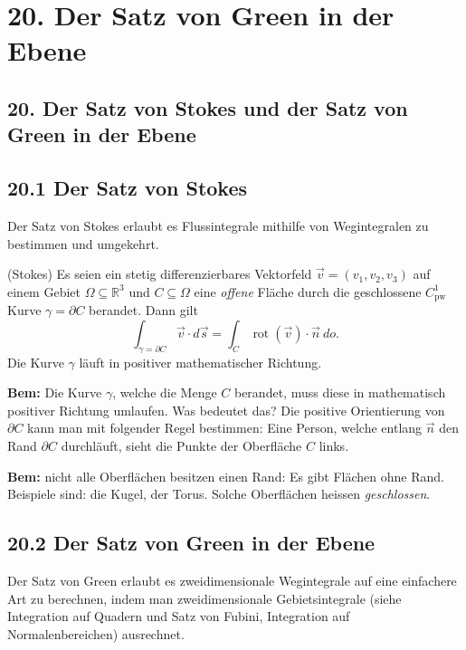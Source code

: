 \documentclass[a4paper,landscape,8pt]{extarticle}
\newcommand{\R}{\mathbb{R}}
\newcommand{\Bem}{\textbf{Bem: }}
\DeclareMathOperator{\rot}{rot}
\begin{document}
\begin{multicols*}{4}
\begin{warmup}
\end{warmup}

\section{20. Der Satz von Green in der Ebene}

\begin{warmup}
\section{20. Der Satz von Stokes und der Satz von Green in der Ebene}

\subsection{20.1 Der Satz von Stokes}

Der Satz von Stokes erlaubt es Flussintegrale mithilfe von Wegintegralen zu
bestimmen und umgekehrt.

\Satz (Stokes) Es seien ein stetig differenzierbares Vektorfeld $\vec{v}
=(v_1,v_2,v_3)$ auf einem Gebiet $\Omega\subseteq \R^3$ und $C\subseteq\Omega$
eine \emph{offene} Fläche durch die geschlossene $C^1_{\text{pw}}$ Kurve
$\gamma=\partial C$ berandet. Dann gilt
\[
\int_{\gamma=\partial C} \vec{v}\cdot d\vec{s} =
\int_C \rot(\vec{v})\cdot\vec{n} \ do.
\]
Die Kurve $\gamma$ läuft in positiver mathematischer Richtung.

\Bem Die Kurve $\gamma$, welche die Menge $C$ berandet, muss diese in
mathematisch positiver Richtung umlaufen. Was bedeutet das? Die positive
Orientierung von $\partial C$ kann man mit folgender Regel bestimmen: Eine
Person, welche entlang $\vec{n}$ den Rand $\partial C$ durchläuft, sieht die
Punkte der Oberfläche $C$ links.

\Bem nicht alle Oberflächen besitzen einen Rand: Es gibt Flächen ohne Rand.
Beispiele sind: die Kugel, der Torus. Solche Oberflächen heissen
\emph{geschlossen}.




\subsection{20.2 Der Satz von Green in der Ebene}

\end{warmup}

Der Satz von Green erlaubt es zweidimensionale Wegintegrale auf eine einfachere
Art zu berechnen, indem man zweidimensionale Gebietsintegrale (siehe
Integration auf Quadern und Satz von Fubini, Integration auf Normalenbereichen)
ausrechnet.


\end{multicols*}
\end{document}
